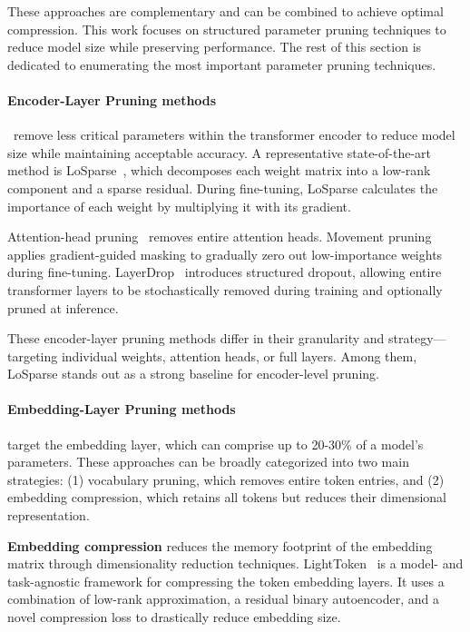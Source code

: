 \documentclass[twocolumn]{article}
\begin{document}
These approaches are complementary and can be combined to achieve optimal compression.
This work focuses on structured parameter pruning techniques to reduce model size while preserving performance. The rest of this section is dedicated to enumerating the most important parameter pruning techniques.


\paragraph{Encoder-Layer Pruning methods}~remove less critical parameters within the transformer encoder to reduce model size while maintaining acceptable accuracy. A representative state-of-the-art method is LoSparse~\cite{li2023losparse}, which decomposes each weight matrix into a low-rank component and a sparse residual. During fine-tuning, LoSparse calculates the importance of each weight by multiplying it with its gradient.

Attention-head pruning~\cite{michel2019sixteen} removes entire attention heads. Movement pruning~\cite{sanh2020movement} applies gradient-guided masking to gradually zero out low-importance weights during fine-tuning. LayerDrop~\cite{fan2020layerdrop} introduces structured dropout, allowing entire transformer layers to be stochastically removed during training and optionally pruned at inference.

These encoder-layer pruning methods differ in their granularity and strategy—targeting individual weights, attention heads, or full layers. Among them, LoSparse stands out as a strong baseline for encoder-level pruning.


\paragraph{Embedding-Layer Pruning methods}
target the embedding layer, which can comprise up to 20-30\% of a model's parameters. These approaches can be broadly categorized into two main strategies: (1) vocabulary pruning, which removes entire token entries, and (2) embedding compression, which retains all tokens but reduces their dimensional representation.

\textbf{Embedding compression} reduces the memory footprint of the embedding matrix through dimensionality reduction techniques. LightToken~\cite{wang2023lighttoken} is a model- and task-agnostic framework for compressing the token embedding layers. It uses a combination of low-rank approximation, a residual binary autoencoder, and a novel compression loss to drastically reduce embedding size. 
\end{document}
